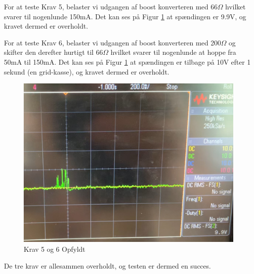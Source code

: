 \documentclass[../main.tex]{subfiles}
\begin{document}
For at teste Krav 5, belaster vi udgangen af boost konverteren med 66$\Omega$ hvilket svarer til nogenlunde 150mA. Det kan ses på Figur \ref{fig: Krav 5 og 6 Opfyldt} at spændingen er 9.9V, og kravet dermed er overholdt.

For at teste Krav 6, belaster vi udgangen af boost konverteren med 200$\Omega$ og skifter den derefter hurtigt til 66$\Omega$ hvilket svarer til nogenlunde at hoppe fra 50mA til 150mA. Det kan ses på Figur \ref{fig: Krav 5 og 6 Opfyldt} at spændingen er tilbage på 10V efter 1 sekund (en grid-kasse), og kravet dermed er overholdt.

\begin{figure}[H]
      \includegraphics[width=\textwidth]{Dokumentation/Pictures/Krav5og6.jpg}
     \caption{Krav 5 og 6 Opfyldt}
     \label{fig: Krav 5 og 6 Opfyldt}
     \end{figure}

De tre krav er allesammen overholdt, og testen er dermed en succes. 
\end{document}
